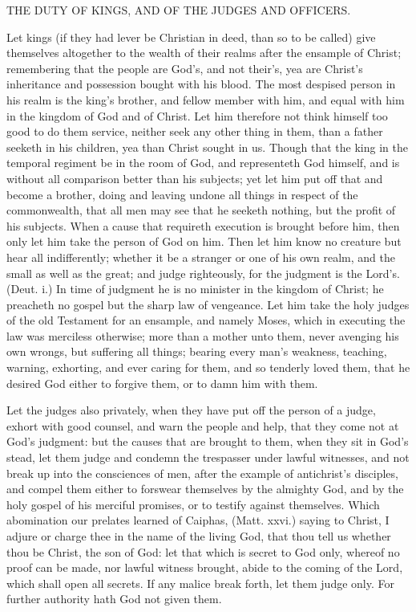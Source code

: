 THE DUTY OF KINGS, AND OF THE JUDGES 
AND OFFICERS. 

Let kings (if they had lever be Christian in deed, than 
so to be called) give themselves altogether to the wealth 
of their realms after the ensample of Christ; remembering 
that the people are God's, and not their's, yea are Christ's 
inheritance and possession bought with his blood. The 
most despised person in his realm is the king's brother, 
and fellow member with him, and equal with him in the 
kingdom of God and of Christ. Let him therefore not 
think himself too good to do them service, neither seek any 
other thing in them, than a father seeketh in his children, 
yea than Christ sought in us. Though that the king in the 
temporal regiment be in the room of God, and representeth 
God himself, and is without all comparison better than 
his subjects; yet let him put off that and become a brother, 
doing and leaving undone all things in respect of the commonwealth,
that all men may see that he seeketh nothing, 
but the profit of his subjects. When a cause that requireth 
execution is brought before him, then only let him take the 
person of God on him. Then let him know no creature 
but hear all indifferently; whether it be a stranger or one 
of his own realm, and the small as well as the great; and 
judge righteously, for the judgment is the Lord's. (Deut. 
i.) In time of judgment he is no minister in the kingdom 
of Christ; he preacheth no gospel but the sharp law 
of vengeance. Let him take the holy judges of the old 
Testament for an ensample, and namely Moses, which in 
executing the law was merciless otherwise; more than a 
mother unto them, never avenging his own wrongs, but 
suffering all things; bearing every man's weakness, teaching, 
warning, exhorting, and ever caring for them, and so 
tenderly loved them, that he desired God either to forgive 
them, or to damn him with them. 

Let the judges also privately, when they have put off 
the person of a judge, exhort with good counsel, and 
warn the people and help, that they come not at God's 
judgment: but the causes that are brought to them, 
when they sit in God's stead, let them judge and condemn 
the trespasser under lawful witnesses, and not break up 
into the consciences of men, after the example of antichrist's
disciples, and compel them either to forswear 
themselves by the almighty God, and by the holy gospel 
of his merciful promises, or to testify against themselves. 
Which abomination our prelates learned of Caiphas, 
(Matt. xxvi.) saying to Christ, I adjure or charge thee in 
the name of the living God, that thou tell us whether 
thou be Christ, the son of God: let that which is secret 
to God only, whereof no proof can be made, nor 
lawful witness brought, abide to the coming of the 
Lord, which shall open all secrets. If any malice break 
forth, let them judge only. For further authority hath 
God not given them. 

